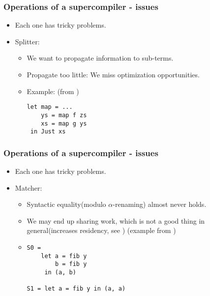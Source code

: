 \documentclass{beamer}
\begin{document}
\begin{frame}[fragile]
    \frametitle{Operations of a supercompiler - issues}

    \begin{itemize}
        \item[] Each one has tricky problems.
        \item[] Splitter:
            \begin{itemize}
                \item
                    We want to propagate information to sub-terms.
                \item
                    Propagate too little: We miss optimization opportunities.
                \item
                    Example: (from \citet{callbyneed-sc})
                    \begin{verbatim}
let map = ...
    ys = map f zs
    xs = map g ys
 in Just xs
                    \end{verbatim}
            \end{itemize}
    \end{itemize}

\end{frame}

\begin{frame}[fragile]
    \frametitle{Operations of a supercompiler - issues}

    \begin{itemize}[<+->]
        \item[] Each one has tricky problems.
        \item[] Matcher:
            \begin{itemize}[<+->]
                \item
                    Syntactic equality(modulo $\alpha$-renaming) almost never
                    holds.
                \item
                    We may end up sharing work, which is not a good thing in
                    general(increases residency, see
                    \citet{commonsubexpression}) (example from
                    \citet{callbyneed-sc})
                \item
                    \begin{verbatim}
S0 =
    let a = fib y
        b = fib y
     in (a, b)

S1 = let a = fib y in (a, a)
                    \end{verbatim}

            \end{itemize}
    \end{itemize}

\end{frame}
\end{document}
